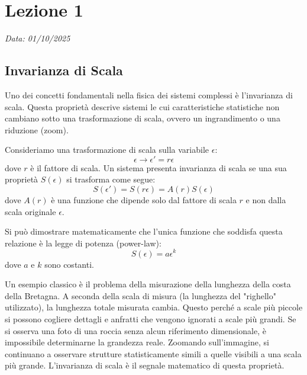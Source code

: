\chapter{Lezione 1}
\label{chap:lezione_01} %

\begin{flushright}
\textit{Data: 01/10/2025}
\end{flushright}


\section{Invarianza di Scala}

Uno dei concetti fondamentali nella fisica dei sistemi complessi è l'invarianza di scala. Questa proprietà descrive sistemi le cui caratteristiche statistiche non cambiano sotto una trasformazione di scala, ovvero un ingrandimento o una riduzione (zoom).

Consideriamo una trasformazione di scala sulla variabile $\epsilon$:
\begin{equation}
\epsilon \rightarrow \epsilon' = r\epsilon
\end{equation}
dove $r$ è il fattore di scala. Un sistema presenta invarianza di scala se una sua proprietà $S(\epsilon)$ si trasforma come segue:
\begin{equation}
S(\epsilon') = S(r\epsilon) = A(r)S(\epsilon)
\end{equation}
dove $A(r)$ è una funzione che dipende solo dal fattore di scala $r$ e non dalla scala originale $\epsilon$.

Si può dimostrare matematicamente che l'unica funzione che soddisfa questa relazione è la legge di potenza (power-law):
\begin{equation}
S(\epsilon) = a\epsilon^k
\end{equation}
dove $a$ e $k$ sono costanti.

Un esempio classico è il problema della misurazione della lunghezza della costa della Bretagna. A seconda della scala di misura (la lunghezza del "righello" utilizzato), la lunghezza totale misurata cambia. Questo perché a scale più piccole si possono cogliere dettagli e anfratti che vengono ignorati a scale più grandi. Se si osserva una foto di una roccia senza alcun riferimento dimensionale, è impossibile determinarne la grandezza reale. Zoomando sull'immagine, si continuano a osservare strutture statisticamente simili a quelle visibili a una scala più grande. L'invarianza di scala è il segnale matematico di questa proprietà.